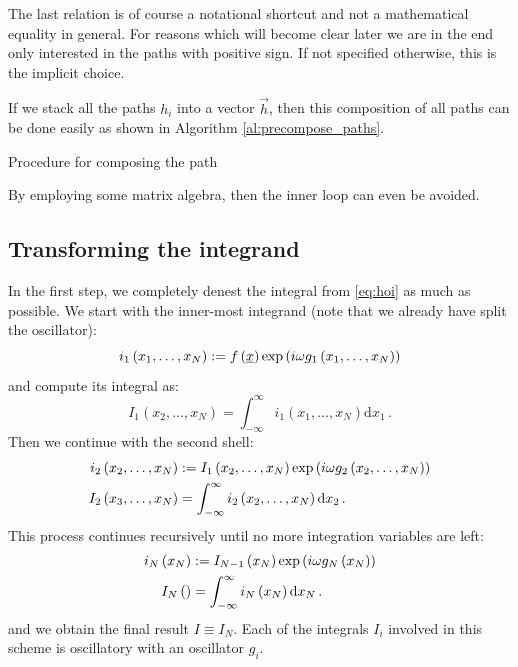 \documentclass[a4paper,10pt]{article}
\begin{document}
The last relation is of course a notational shortcut and
not a mathematical equality in general. For reasons which
will become clear later we are in the end only interested
in the paths with positive sign. If not specified otherwise,
this is the implicit choice.

If we stack all the paths $h_i$ into a vector $\vec{h}$, then
this composition of all paths can be done easily as shown
in Algorithm \ref{al:precompose_paths}.
\begin{algorithm}
  \caption{Procedure for composing the path}
  \label{al:precompose_paths}
  \begin{algorithmic}
      \EndFor
    \EndFor
  \end{algorithmic}
\end{algorithm}
By employing some matrix algebra, then the inner loop
can even be avoided.


\subsection{Transforming the integrand}


In the first step, we completely denest the integral from
\eqref{eq:hoi} as much as possible.
We start with the inner-most integrand (note that we already
have split the oscillator):
\begin{equation}
  i_1\left(x_1,\ldots,x_N\right) := f\left(\underline{x}\right) \exp\left(i\omega g_1\left(x_1,\ldots,x_N\right)\right)
\end{equation}
and compute its integral as:
\begin{equation}
  I_1\left(x_2,\ldots,x_N\right) = \int_{-\infty}^\infty i_1\left(x_1,\ldots,x_N\right) \mathrm{d}x_1 \,.
\end{equation}
Then we continue with the second shell:
\begin{equation}
\begin{split}
  i_2\left(x_2,\ldots,x_N\right) & := I_1\left(x_2,\ldots,x_N\right) \exp\left(i\omega g_2\left(x_2,\ldots,x_N\right)\right) \\
  I_2\left(x_3,\ldots,x_N\right) & = \int_{-\infty}^\infty i_2\left(x_2,\ldots,x_N\right) \mathrm{d}x_2 \,.
\end{split}
\end{equation}
This process continues recursively until no more integration
variables are left:
\begin{equation}
\begin{split}
  i_N\left(x_N\right) & := I_{N-1}\left(x_N\right) \exp\left(i\omega g_N\left(x_N\right)\right) \\
  I_N\left(\right)    & = \int_{-\infty}^\infty i_N\left(x_N\right) \mathrm{d}x_N \,.
\end{split}
\end{equation}
and we obtain the final result $I \equiv I_N$. Each of the integrals $I_i$
involved in this scheme is oscillatory with an oscillator $g_i$.
\end{document}
